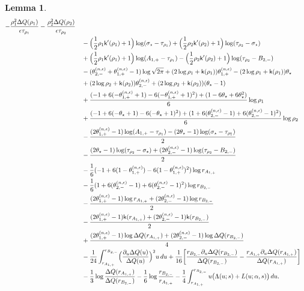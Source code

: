 \documentclass[a4paper]{article}
\newtheorem{lemma}[theorem]{Lemma}
\numberwithin{equation}{section}
\begin{document}
\begin{lemma}
\begin{align*}
-\frac{\rho_1^2\Delta Q(\rho_1)}{\epsilon\tau_{\rho_1}}
-\frac{\rho_2^2\Delta Q(\rho_2)}{\epsilon\tau_{\rho_2}}
\\
&\quad
-\Bigl(\frac{1}{2}\rho_1\mathsf{k}'(\rho_1)+1\Bigr)\log(\sigma_{\star}-\tau_{\rho_1})
+\Bigl(\frac{1}{2}\rho_2\mathsf{k}'(\rho_2)+1\Bigr)\log(\tau_{\rho_2}-\sigma_{\star})
\\
&\quad
+\Bigl(\frac{1}{2}\rho_1\mathsf{k}'(\rho_1)+1\Bigr)\log(A_{1,+}-\tau_{\rho_1})
-\Bigl(\frac{1}{2}\rho_2\mathsf{k}'(\rho_2)+1\Bigr)\log(\tau_{\rho_2}-B_{2,-})
\\
&\quad 
-(\theta_{2,-}^{(n,\epsilon)}+\theta_{1,+}^{(n,\epsilon)}-1)\log\sqrt{2\pi}
+(2\log\rho_1+\mathsf{k}(\rho_1))\theta_{1,+}^{(n,\epsilon)}
-(2\log\rho_1+\mathsf{k}(\rho_1))\theta_{\star}
\\
&\quad
+(2\log\rho_2+\mathsf{k}(\rho_2))\theta_{2,-}^{(n,\epsilon)}
+(2\log\rho_2+\mathsf{k}(\rho_2))(\theta_{\star}-1)
\\
&\quad +\frac{(-1+6(-\theta_{1,+}^{(n,\epsilon)}+1)-6(-\theta_{1,+}^{(n,\epsilon)}+1)^2)+(1-6\theta_{\star}+6\theta_{\star}^2)}{6}\log\rho_1
\\
&\quad +
\frac{(-1+6(-\theta_{\star}+1)-6(-\theta_{\star}+1)^2)+(1+6(\theta_{2,-}^{(n,\epsilon)}-1)+6(\theta_{2,-}^{(n,\epsilon)}-1)^2)}{6}\log\rho_2
\\
&\quad  -\frac{(2\theta_{1,+}^{(n,\epsilon)}-1)\log(A_{1,+}-\tau_{\rho_1})-(2\theta_{\star}-1)\log(\sigma_{\star}-\tau_{\rho_1})}{2}
\\
&\quad -\frac{(2\theta_{\star}-1)\log(\tau_{\rho_2}-\sigma_{\star})+(2\theta_{2,-}^{(n,\epsilon)}-1)\log(\tau_{\rho_2}-B_{2,-})}{2}
\\
&\quad
-\frac{1}{6}
(-1+6(1-\theta_{1,+}^{(n,\epsilon)})-6(1-\theta_{1,+}^{(n,\epsilon)})^2)\log r_{A_{1,+}}
\\
&\quad
-\frac{1}{6}(1+6(\theta_{2,-}^{(n,\epsilon)}-1)+6(\theta_{2,-}^{(n,\epsilon)}-1)^2)\log r_{B_{2,-}}
\\
&\quad
-\frac{(2\theta_{1,+}^{(n,\epsilon)}-1)\log r_{A_{1,+}}+(2\theta_{2,-}^{(n,\epsilon)}-1)\log r_{B_{2,-}}}{2}
\\
&\quad
-\frac{(2\theta_{1,+}^{(n,\epsilon)}-1)\mathsf{k}(r_{A_{1,+}})+(2\theta_{2,-}^{(n,\epsilon)}-1)\mathsf{k}(r_{B_{2,-}})}{2}
\\
&\quad
+\frac{(2\theta_{1,+}^{(n,\epsilon)}-1)\log\Delta Q(r_{A_{1,+}})+(2\theta_{2,-}^{(n,\epsilon)}-1)\log\Delta Q(r_{B_{2,-}})}{4}
\\
&\quad
-\frac{1}{24}\int_{r_{A_{1,+}}}^{r_{B_{2,-}}}\Bigl(\frac{\partial_u \Delta Q(u)}{\Delta Q(u)}\Bigr)^2u\,du
+\frac{1}{16}\bigg[
\frac{r_{B_{2,-}}\partial_u\Delta Q(r_{B_{2,-}})}{\Delta Q(r_{B_{2,-}})}-\frac{r_{A_{1,+}}\partial_u\Delta Q(r_{A_{1,+}})}{\Delta Q(r_{A_{1,+}})}
\bigg]\\
&\quad -\frac{1}{3}\log\frac{\Delta Q(r_{A_{1,+}})}{\Delta Q(r_{B_{2,-}})}
-\frac{1}{6}\log\frac{r_{B_{2,-}}}{r_{A_{1,+}}}
-\frac{1}{4}\int_{r_{A_{1,+}}}^{r_{B_{2,-}}}u\bigl( \Lambda(u;s)+L(u;\alpha,s)\bigr)\,du.
\end{align*}   
\end{lemma}
\end{document}
